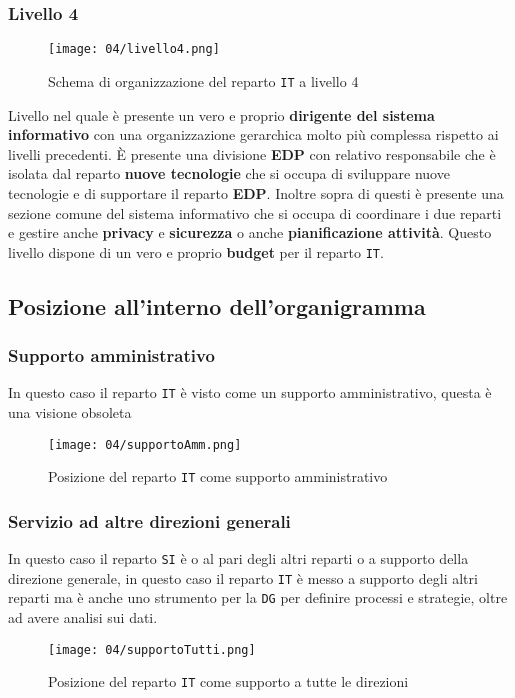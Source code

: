         \subsubsection{Livello 4}
            \begin{figure}[H]
                \centering 
                \texttt{[image: 04/livello4.png]}
                \caption{Schema di organizzazione del reparto \texttt{IT} a livello 4}
            \end{figure}
            Livello nel quale è presente un vero e proprio \textbf{dirigente del sistema informativo} con una organizzazione gerarchica molto più complessa rispetto ai livelli precedenti. È presente una divisione \textbf{EDP} con relativo responsabile che è isolata dal reparto \textbf{nuove tecnologie} che si occupa di sviluppare nuove tecnologie e di supportare il reparto \textbf{EDP}. Inoltre sopra di questi è presente una sezione comune del sistema informativo che si occupa di coordinare i due reparti e gestire anche \textbf{privacy} e \textbf{sicurezza} o anche \textbf{pianificazione attività}. Questo livello dispone di un vero e proprio \textbf{budget} per il reparto \texttt{IT}.
    \subsection{Posizione all'interno dell'organigramma}
        \subsubsection{Supporto amministrativo} 
            In questo caso il reparto \texttt{IT} è visto come un supporto amministrativo, questa è una visione obsoleta 
            \begin{figure}[H]
                \centering 
                \texttt{[image: 04/supportoAmm.png]}
                \caption{Posizione del reparto \texttt{IT} come supporto amministrativo}
            \end{figure}
        \subsubsection{Servizio ad altre direzioni generali}
            In questo caso il reparto \texttt{SI} è o al pari degli altri reparti o a supporto della direzione generale, in questo caso il reparto \texttt{IT} è messo a supporto degli altri reparti ma è anche uno strumento per la \texttt{DG} per definire processi e strategie, oltre ad avere analisi sui dati.
            \begin{figure}[H]
                \centering 
                \texttt{[image: 04/supportoTutti.png]}
                \caption{Posizione del reparto \texttt{IT} come supporto a tutte le direzioni}
            \end{figure}
